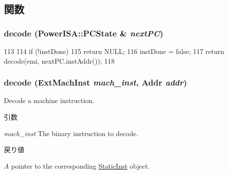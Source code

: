 \subsection{関数}
\hypertarget{classPowerISA_1_1Decoder_a56285ab0fc7228a06c1af831d0f3a949}{
\subsubsection[{decode}]{ decode (PowerISA::PCState \& {\em nextPC})}}
\label{classPowerISA_1_1Decoder_a56285ab0fc7228a06c1af831d0f3a949}



\begin{DoxyCode}
113     {
114         if (!instDone)
115             return NULL;
116         instDone = false;
117         return decode(emi, nextPC.instAddr());
118     }
\end{DoxyCode}
\hypertarget{classPowerISA_1_1Decoder_a4ed948f8d08575cc2916fe32154ea69d}{
\subsubsection[{decode}]{ decode (ExtMachInst {\em mach\_\-inst}, \/  {\bf Addr} {\em addr})}}
\label{classPowerISA_1_1Decoder_a4ed948f8d08575cc2916fe32154ea69d}
Decode a machine instruction. 
\begin{DoxyParams}{引数}
\item[{\em mach\_\-inst}]The binary instruction to decode. \end{DoxyParams}

\begin{DoxyRetVals}{戻り値}
\item[{\em A}]pointer to the corresponding \hyperlink{classStaticInst}{StaticInst} object. \end{DoxyRetVals}



